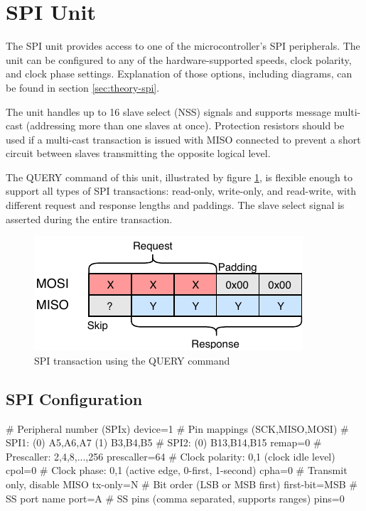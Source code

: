 \section{SPI Unit}

The \gls{SPI} unit provides access to one of the microcontroller's \gls{SPI} peripherals. The unit can be configured to any of the hardware-supported speeds, clock polarity, and clock phase settings. Explanation of those options, including diagrams, can be found in section \ref{sec:theory-spi}.

The unit handles up to 16 slave select (\gls{NSS}) signals and supports message multi-cast (addressing more than one slaves at once). Protection resistors should be used if a multi-cast transaction is issued with \gls{MISO} connected to prevent a short circuit between slaves transmitting the opposite logical level.

The QUERY command of this unit, illustrated by figure \ref{fig:spi_query}, is flexible enough to support all types of \gls{SPI} transactions: read-only, write-only, and read-write, with different request and response lengths and paddings. The slave select signal is asserted during the entire transaction.

\begin{figure}[h]
	\centering
	\includegraphics[scale=1.1] {img/spi-query.pdf}
	\caption{\label{fig:spi_query}SPI transaction using the QUERY command}
\end{figure}

\subsection{SPI Configuration}

\begin{inicode}
# Peripheral number (SPIx)
device=1
# Pin mappings (SCK,MISO,MOSI)
#  SPI1: (0) A5,A6,A7     (1) B3,B4,B5
#  SPI2: (0) B13,B14,B15
remap=0
# Prescaller: 2,4,8,...,256
prescaller=64
# Clock polarity: 0,1 (clock idle level)
cpol=0
# Clock phase: 0,1 (active edge, 0-first, 1-second)
cpha=0
# Transmit only, disable MISO
tx-only=N
# Bit order (LSB or MSB first)
first-bit=MSB
# SS port name
port=A
# SS pins (comma separated, supports ranges)
pins=0
\end{inicode}

